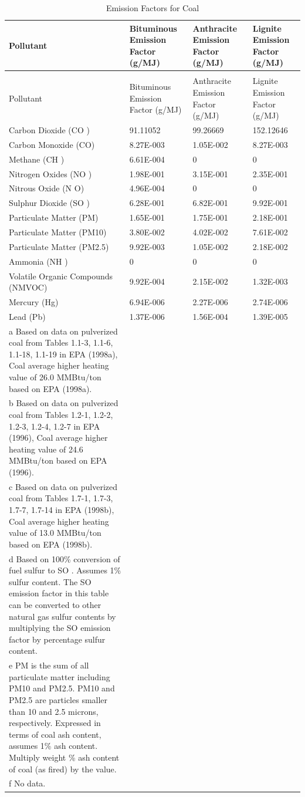 \begin{longtable}[c]{p{1.5in}p{1.5in}p{1.5in}p{1.5in}}
\caption{Emission Factors for Coal \label{table:emission-factors-for-coal}} \tabularnewline
\toprule 
Pollutant & Bituminous Emission Factor   (g/MJ) & Anthracite Emission Factor   (g/MJ) & Lignite Emission Factor   (g/MJ) \tabularnewline
\midrule
\endfirsthead

\caption[]{Emission Factors for Coal} \tabularnewline
\toprule 
Pollutant & Bituminous Emission Factor   (g/MJ) & Anthracite Emission Factor   (g/MJ) & Lignite Emission Factor   (g/MJ) \tabularnewline
\midrule
\endhead

Carbon Dioxide (CO  ) & 91.11052 & 99.26669 & 152.12646 \tabularnewline
Carbon Monoxide (CO) & 8.27E-003 & 1.05E-002 & 8.27E-003 \tabularnewline
Methane (CH  ) & 6.61E-004 & 0 & 0 \tabularnewline
Nitrogen Oxides (NO  ) & 1.98E-001 & 3.15E-001 & 2.35E-001 \tabularnewline
Nitrous Oxide (N  O) & 4.96E-004 & 0 & 0 \tabularnewline
Sulphur Dioxide (SO  ) & 6.28E-001 & 6.82E-001 & 9.92E-001 \tabularnewline
Particulate Matter (PM) & 1.65E-001 & 1.75E-001 & 2.18E-001 \tabularnewline
Particulate Matter (PM10) & 3.80E-002 & 4.02E-002 & 7.61E-002 \tabularnewline
Particulate Matter (PM2.5) & 9.92E-003 & 1.05E-002 & 2.18E-002 \tabularnewline
Ammonia (NH  ) & 0 & 0 & 0 \tabularnewline
Volatile Organic Compounds (NMVOC) & 9.92E-004 & 2.15E-002 & 1.32E-003 \tabularnewline
Mercury (Hg) & 6.94E-006 & 2.27E-006 & 2.74E-006 \tabularnewline
Lead (Pb) & 1.37E-006 & 1.56E-004 & 1.39E-005 \tabularnewline
a Based on data on pulverized coal from Tables 1.1-3, 1.1-6, 1.1-18, 1.1-19 in EPA (1998a), Coal average higher heating value of 26.0 MMBtu/ton based on EPA (1998a). \tabularnewline
b Based on data on pulverized coal from Tables 1.2-1, 1.2-2, 1.2-3, 1.2-4, 1.2-7 in EPA (1996), Coal average higher heating value of 24.6 MMBtu/ton based on EPA (1996). \tabularnewline
c Based on data on pulverized coal from Tables 1.7-1, 1.7-3, 1.7-7, 1.7-14 in EPA (1998b), Coal average higher heating value of 13.0 MMBtu/ton based on EPA (1998b). \tabularnewline
d Based on 100\% conversion of fuel sulfur to SO  . Assumes 1\% sulfur content. The SO   emission factor in this table can be converted to other natural gas sulfur contents by multiplying the SO   emission factor by percentage sulfur content. \tabularnewline
e PM is the sum of all particulate matter including PM10 and PM2.5. PM10 and PM2.5 are particles smaller than 10 and 2.5 microns, respectively. Expressed in terms of coal ash content, assumes 1\% ash content. Multiply weight \% ash content of coal (as fired) by the value. \tabularnewline
f No data. \tabularnewline
\bottomrule
\end{longtable}

